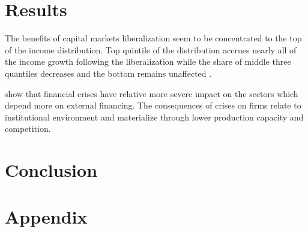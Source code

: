 \documentclass[a4paper,11pt]{article}
\begin{document}
\section{Results}
The benefits of capital markets liberalization seem to be concentrated to the top of the income distribution. Top quintile of the distribution accrues nearly all of the income growth following the liberalization while the share of middle three quantiles decreases and the bottom remains unaffected \citep{das2003income}.

\citet{kroszneretal2007} show that financial crises have relative more severe impact on the sectors which depend more on external financing. The consequences of crises on firms relate to institutional environment and materialize through lower production capacity and competition.

\section{Conclusion}
\label{sec:conclusion}

\clearpage
%


%
\clearpage
%
\section{Appendix}
\label{sec:appch2}
\renewcommand{\thesection}{A\arabic{section}}%
\renewcommand{\thetable}{A\arabic{table}}%
\renewcommand{\thefigure}{A\arabic{figure}}%
\renewcommand{\theequation}{A\arabic{eq}} 
\end{document}
